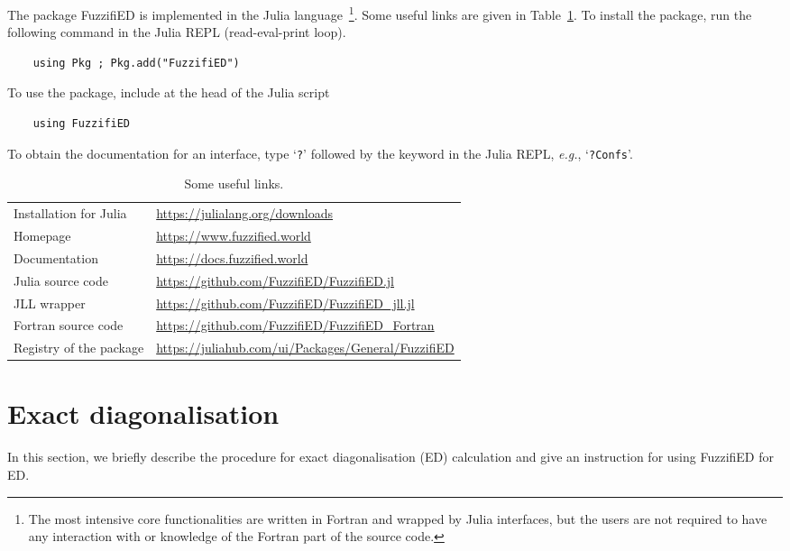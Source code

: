 \documentclass{timesjhep}
\begin{document}
The package FuzzifiED is implemented in the Julia language~\cite{Julia}\footnote{The most intensive core functionalities are written in Fortran and wrapped by Julia interfaces, but the users are not required to have any interaction with or knowledge of the Fortran part of the source code.}. Some useful links are given in Table~\ref{tbl:link}. To install the package, run the following command in the Julia REPL (read-eval-print loop). 
\begin{lstlisting}
    using Pkg ; Pkg.add("FuzzifiED")
\end{lstlisting}
To use the package, include at the head of the Julia script
\begin{lstlisting}
    using FuzzifiED
\end{lstlisting}
To obtain the documentation for an interface, type `\lstinline|?|' followed by the keyword in the Julia REPL, \textit{e.g.}, `\lstinline|?Confs|'.

\begin{table}[htbp]
    \centering
    \begin{tabular}{l|l}
        \hline\hline
        Installation for Julia&\url{https://julialang.org/downloads}\\
        Homepage&\url{https://www.fuzzified.world}\\
        Documentation&\url{https://docs.fuzzified.world}\\
        Julia source code&\url{https://github.com/FuzzifiED/FuzzifiED.jl}\\
        JLL wrapper&\url{https://github.com/FuzzifiED/FuzzifiED_jll.jl}\\
        Fortran source code&\url{https://github.com/FuzzifiED/FuzzifiED_Fortran}\\
        Registry of the package&\url{https://juliahub.com/ui/Packages/General/FuzzifiED}\\
        \hline\hline
    \end{tabular}
    \caption{Some useful links.}
    \label{tbl:link}
\end{table}

\section{Exact diagonalisation}
\label{sec:ed}

In this section, we briefly describe the procedure for exact diagonalisation (ED) calculation and give an instruction for using FuzzifiED for ED. 
\end{document}
